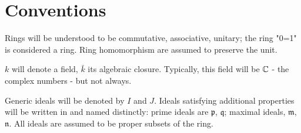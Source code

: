 \section{Conventions}


Rings will be understood to be commutative, associative, unitary; the ring "0=1" is considered a ring. Ring homomorphism are assumed to preserve the unit.

$k$ will denote a field, $\bar k$ its algebraic closure. Typically, this field will be $\mathbb C$ - the complex numbers - but not always.

Generic ideals will be denoted by $I$ and $J$. Ideals satisfying additional properties will be written in  and named distinctly: prime ideals are $\mathfrak p$, $\mathfrak q$; maximal ideals, $\mathfrak m$, $\mathfrak n$. All ideals are assumed to be proper subsets of the ring.


